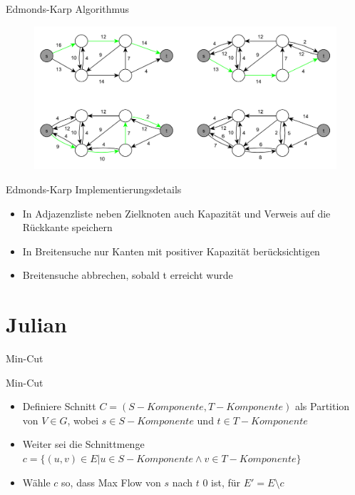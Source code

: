 \documentclass[18pt]{beamer}
\begin{document}
\begin{frame}{Edmonds-Karp Algorithmus}
\begin{figure}
	\includegraphics[width = \textwidth]{img/Jakob_Edmond.pdf}
\end{figure}
\end{frame}

\begin{frame}{Edmonds-Karp Implementierungsdetails}
\begin{itemize}
	\item In Adjazenzliste neben Zielknoten auch Kapazit\"at und Verweis auf die R\"uckkante speichern
	\item In Breitensuche nur Kanten mit positiver Kapazit\"at ber\"ucksichtigen
	\item Breitensuche abbrechen, sobald t erreicht wurde
\end{itemize}
\end{frame}


\section{Julian}
\begin{frame}{Min-Cut}
\begin{block}{Min-Cut}

\begin{itemize}
\item Definiere Schnitt \(C = (S-Komponente, T-Komponente)\) als Partition von \(V \in G \), wobei \(s \in S-Komponente\) und \(t \in T-Komponente\) 
\item Weiter sei die Schnittmenge \(c = \{(u, v) \in E | u \in S-Komponente \land v \in T-Komponente\}\)
\item W\"ahle \(c\) so, dass Max Flow von \(s\) nach \(t\) 0 ist, f\"ur \(E'=E\setminus c\) 
\end{itemize}
\end{block}
\end{frame}
\end{document}
